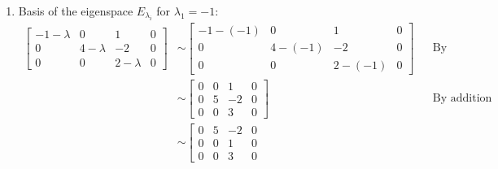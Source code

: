 \documentclass[10pt,letterpaper,final]{report}
\newcommand{\reason}[1]{&& \text{#1}}
\begin{document}
\begin{enumerate}[label=(\alph*)]
        \begin{enumerate}[label=(\arabic*)]
          \item Basis of the eigenspace $E_{\lambda_i}$ for $\lambda_1 = -1$:
                \begin{align*}
                  \left[\begin{array}{rrr|r}
                      -1 - \lambda & 0           & 1           & 0 \\
                      0            & 4 - \lambda & -2          & 0 \\
                      0            & 0           & 2 - \lambda & 0
                    \end{array}\right] & \sim \left[\begin{array}{rrr|r}
                                                  -1 - (-1) & 0        & 1        & 0 \\
                                                  0         & 4 - (-1) & -2       & 0 \\
                                                  0         & 0        & 2 - (-1) & 0
                                                \end{array}\right] \reason{By substitution}                                          \\[1ex]
                                                                      & \sim \left[\begin{array}{rrr|r}
                                                                                 0 & 0 & 1  & 0 \\
                                                                                 0 & 5 & -2 & 0 \\
                                                                                 0 & 0 & 3  & 0
                                                                               \end{array}\right] \reason{By addition}               \\[1ex]
                                                                      & \sim \left[\begin{array}{rrr|r}
                                                                                 0 & 5 & -2 & 0 \\
                                                                                 0 & 0 & 1  & 0 \\
                                                                                 0 & 0 & 3  & 0

\end{array}
\end{align*}
\end{enumerate}
\end{enumerate}
\end{document}

